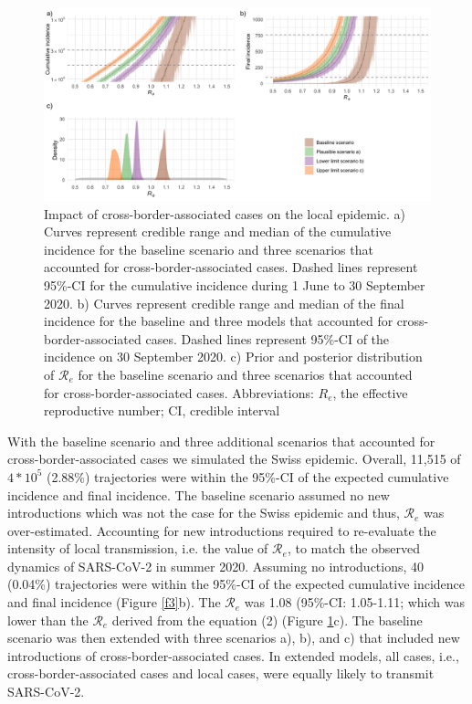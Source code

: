 \documentclass[10pt, a4paper, twoside]{article}
\begin{document}
\begin{multicols}{2}
\begin{figure}
\centering
\includegraphics[scale=0.15]{Figure2_2021-06-02.png}
\caption{Impact of cross-border-associated cases on the local epidemic.
a) Curves represent credible range and median of the cumulative incidence for the baseline scenario and three scenarios that accounted for cross-border-associated cases.
Dashed lines represent 95\%-CI for the cumulative incidence during 1 June to 30 September 2020.
b) Curves represent credible range and median of the final incidence for the baseline and three models that accounted for cross-border-associated cases.
Dashed lines represent 95\%-CI of the incidence on 30 September 2020.
c) Prior and posterior distribution of $\mathcal{R}_e$ for the baseline scenario and three scenarios that accounted for cross-border-associated cases.
Abbreviations: $R_e$, the effective reproductive number; CI, credible interval}

\label{f2}
\end{figure}

With the baseline scenario and three additional scenarios that accounted for cross-border-associated cases we simulated the Swiss epidemic.
Overall, 11,515 of $4*10^5$ (2.88\%) trajectories were within the 95\%-CI of the expected cumulative incidence and final incidence.
The baseline scenario assumed no new introductions which was not the case for the Swiss epidemic and thus, $\mathcal{R}_e$ was over-estimated.
Accounting for new introductions required to re-evaluate the intensity of local transmission, i.e. the value of $\mathcal{R}_e$, to match the observed dynamics of SARS-CoV-2 in summer 2020.
Assuming no introductions, 40 (0.04\%) trajectories were within the 95\%-CI of the expected cumulative incidence and final incidence (Figure \ref{f3}b).
The $\mathcal{R}_e$ was 1.08 (95\%-CI: 1.05-1.11; which was lower than the $\mathcal{R}_e$ derived from the equation (2) (Figure \ref{f2}c).
The baseline scenario was then extended with three scenarios a), b), and c) that included new introductions of cross-border-associated cases.
In extended models, all cases, i.e., cross-border-associated cases and local cases, were equally likely to transmit SARS-CoV-2.


\end{multicols}
\end{document}
